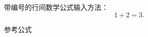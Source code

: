 \documentclass[a5paper,12pt]{ctexart}
\begin{document}
    带编号的行间数学公式输入方法：
    \begin{equation}
        1 + 2 = 3.
    \end{equation}

    参考公式
\end{document}

